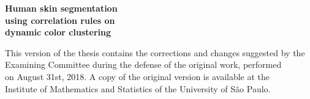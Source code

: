 \documentclass[12pt,twoside,a4paper]{book}
\theoremstyle{plain}
\theoremstyle{definition}
\begin{document}
%
%
%
%
%
%


%
%
%
%
\newpage
\thispagestyle{empty}
    \begin{center}
        \vspace*{2.3 cm}
        \textbf{\Large{Human skin segmentation\\[-0.25cm]
        using correlation rules on\\
        dynamic color clustering}}\\
        \vspace*{2 cm}
    \end{center}

    \vskip 2cm

    \begin{flushright}
    This version of the thesis contains the corrections and changes suggested by the\\
    Examining Committee during the defense of the original work, performed\\
    on August 31st, 2018. A copy of the original version is available at the\\
    Institute of Mathematics and Statistics of the University of São Paulo.

    \vskip 2cm

    \end{flushright}
    \vskip 4.2cm
\end{document}
